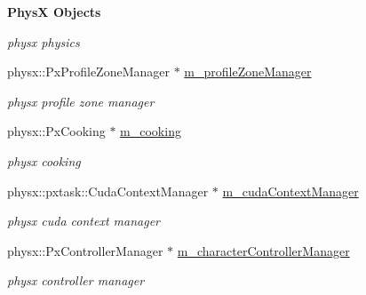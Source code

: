 \begin{Indent}{\bf PhysX Objects}
\begin{DoxyCompactItemize}
\begin{DoxyCompactList}\small\item\em physx physics \item\end{DoxyCompactList}\item 
\hypertarget{classContent_1_1Physics_1_1PhysX_1_1Physics_aa8c01e1b0f921ed2a423894774f53ead}{
physx::PxProfileZoneManager $\ast$ \hyperlink{classContent_1_1Physics_1_1PhysX_1_1Physics_aa8c01e1b0f921ed2a423894774f53ead}{m\_\-profileZoneManager}}
\label{classContent_1_1Physics_1_1PhysX_1_1Physics_aa8c01e1b0f921ed2a423894774f53ead}

\begin{DoxyCompactList}\small\item\em physx profile zone manager \item\end{DoxyCompactList}\item 
\hypertarget{classContent_1_1Physics_1_1PhysX_1_1Physics_ad41972735a4e56def8293e84d08bcfc3}{
physx::PxCooking $\ast$ \hyperlink{classContent_1_1Physics_1_1PhysX_1_1Physics_ad41972735a4e56def8293e84d08bcfc3}{m\_\-cooking}}
\label{classContent_1_1Physics_1_1PhysX_1_1Physics_ad41972735a4e56def8293e84d08bcfc3}

\begin{DoxyCompactList}\small\item\em physx cooking \item\end{DoxyCompactList}\item 
\hypertarget{classContent_1_1Physics_1_1PhysX_1_1Physics_a01a2e503d7fadbc1e5f50543681fb9fa}{
physx::pxtask::CudaContextManager $\ast$ \hyperlink{classContent_1_1Physics_1_1PhysX_1_1Physics_a01a2e503d7fadbc1e5f50543681fb9fa}{m\_\-cudaContextManager}}
\label{classContent_1_1Physics_1_1PhysX_1_1Physics_a01a2e503d7fadbc1e5f50543681fb9fa}

\begin{DoxyCompactList}\small\item\em physx cuda context manager \item\end{DoxyCompactList}\item 
\hypertarget{classContent_1_1Physics_1_1PhysX_1_1Physics_ae0c9fbf94995a23c5934b2e96ef316d9}{
physx::PxControllerManager $\ast$ \hyperlink{classContent_1_1Physics_1_1PhysX_1_1Physics_ae0c9fbf94995a23c5934b2e96ef316d9}{m\_\-characterControllerManager}}
\label{classContent_1_1Physics_1_1PhysX_1_1Physics_ae0c9fbf94995a23c5934b2e96ef316d9}

\begin{DoxyCompactList}\small\item\em physx controller manager \item\end{DoxyCompactList}\end{DoxyCompactItemize}
\end{Indent}


